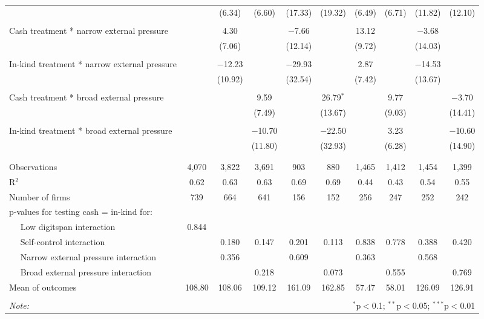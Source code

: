\documentclass{report}
\begin{document}
\begin{table}[!htbp]
\begin{tabular}{@{\extracolsep{5pt}}lccccccccc}
  &  & (6.34) & (6.60) & (17.33) & (19.32) & (6.49) & (6.71) & (11.82) & (12.10) \\ 
  & & & & & & & & & \\ 
 Cash treatment * narrow external pressure &  & 4.30 &  & $-$7.66 &  & 13.12 &  & $-$3.68 &  \\ 
  &  & (7.06) &  & (12.14) &  & (9.72) &  & (14.03) &  \\ 
  & & & & & & & & & \\ 
 In-kind treatment * narrow external pressure &  & $-$12.23 &  & $-$29.93 &  & 2.87 &  & $-$14.53 &  \\ 
  &  & (10.92) &  & (32.54) &  & (7.42) &  & (13.67) &  \\ 
  & & & & & & & & & \\ 
 Cash treatment * broad external pressure &  &  & 9.59 &  & 26.79$^{*}$ &  & 9.77 &  & $-$3.70 \\ 
  &  &  & (7.49) &  & (13.67) &  & (9.03) &  & (14.41) \\ 
  & & & & & & & & & \\ 
 In-kind treatment * broad external pressure &  &  & $-$10.70 &  & $-$22.50 &  & 3.23 &  & $-$10.60 \\ 
  &  &  & (11.80) &  & (32.93) &  & (6.28) &  & (14.90) \\ 
  & & & & & & & & & \\ 
\hline \\[-1.8ex] 
Observations & 4,070 & 3,822 & 3,691 & 903 & 880 & 1,465 & 1,412 & 1,454 & 1,399 \\ 
R$^{2}$ & 0.62 & 0.63 & 0.63 & 0.69 & 0.69 & 0.44 & 0.43 & 0.54 & 0.55 \\ 
Number of firms & 739 & 664 & 641 & 156 & 152 & 256 & 247 & 252 & 242 \\ 
p-values for testing cash = in-kind for: &  &  &  &  &  &  &  &  &  \\ 
$\quad$ Low digitspan interaction & 0.844 &  &  &  &  &  &  &  &  \\ 
$\quad$ Self-control interaction &  & 0.180 & 0.147 & 0.201 & 0.113 & 0.838 & 0.778 & 0.388 & 0.420 \\ 
$\quad$ Narrow external pressure interaction &  & 0.356 &  & 0.609 &  & 0.363 &  & 0.568 &  \\ 
$\quad$ Broad external pressure interaction &  &  & 0.218 &  & 0.073 &  & 0.555 &  & 0.769 \\ 
Mean of outcomes & 108.80 & 108.06 & 109.12 & 161.09 & 162.85 & 57.47 & 58.01 & 126.09 & 126.91 \\ 
\hline \\[-1.8ex] 
\textit{Note:}  & \multicolumn{9}{r}{$^{*}$p$<$0.1; $^{**}$p$<$0.05; $^{***}$p$<$0.01} \\ 
\end{tabular} 
\end{table} 
\end{document}
